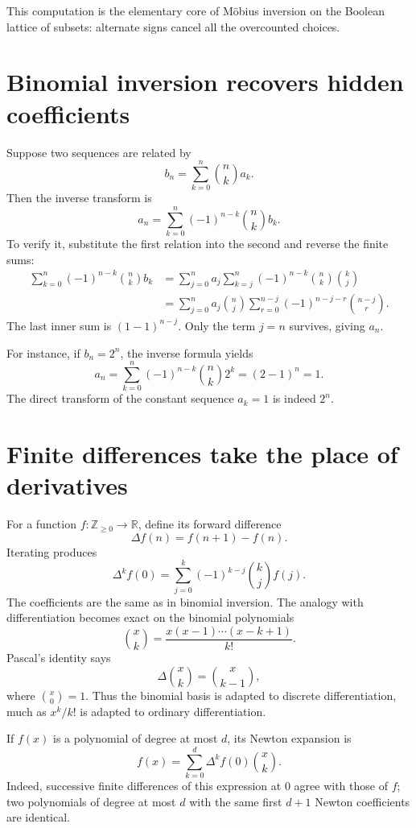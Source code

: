 This computation is the elementary core of Möbius inversion on the Boolean lattice of subsets: alternate signs cancel all the overcounted choices.

\section{Binomial inversion recovers hidden coefficients}

Suppose two sequences are related by
\[
 b_n=\sum_{k=0}^n\binom nk a_k.
\]
Then the inverse transform is
\[
 \boxed{a_n=\sum_{k=0}^n(-1)^{n-k}\binom nk b_k.}
\]
To verify it, substitute the first relation into the second and reverse the finite sums:
\[
\begin{aligned}
 \sum_{k=0}^n(-1)^{n-k}\binom nk b_k
 &=\sum_{j=0}^na_j
   \sum_{k=j}^n(-1)^{n-k}\binom nk\binom kj\\
 &=\sum_{j=0}^na_j\binom nj
   \sum_{r=0}^{n-j}(-1)^{n-j-r}\binom{n-j}r.
\end{aligned}
\]
The last inner sum is \((1-1)^{n-j}\). Only the term \(j=n\) survives, giving \(a_n\).

For instance, if \(b_n=2^n\), the inverse formula yields
\[
 a_n=\sum_{k=0}^n(-1)^{n-k}\binom nk2^k=(2-1)^n=1.
\]
The direct transform of the constant sequence \(a_k=1\) is indeed \(2^n\).

\section{Finite differences take the place of derivatives}

For a function \(f:\mathbb Z_{\ge0}\to\mathbb R\), define its forward difference
\[
 \Delta f(n)=f(n+1)-f(n).
\]
Iterating produces
\[
 \boxed{\Delta^kf(0)
 =\sum_{j=0}^k(-1)^{k-j}\binom kj f(j).}
\]
The coefficients are the same as in binomial inversion. The analogy with differentiation becomes exact on the binomial polynomials
\[
 \binom{x}{k}=\frac{x(x-1)\cdots(x-k+1)}{k!}.
\]
Pascal's identity says
\[
 \Delta\binom{x}{k}=\binom{x}{k-1},
\]
where \(\binom{x}{0}=1\). Thus the binomial basis is adapted to discrete differentiation, much as \(x^k/k!\) is adapted to ordinary differentiation.

If \(f(x)\) is a polynomial of degree at most \(d\), its Newton expansion is
\[
 \boxed{f(x)=\sum_{k=0}^d\Delta^kf(0)\binom{x}{k}.}
\]
Indeed, successive finite differences of this expression at \(0\) agree with those of \(f\); two polynomials of degree at most \(d\) with the same first \(d+1\) Newton coefficients are identical.


